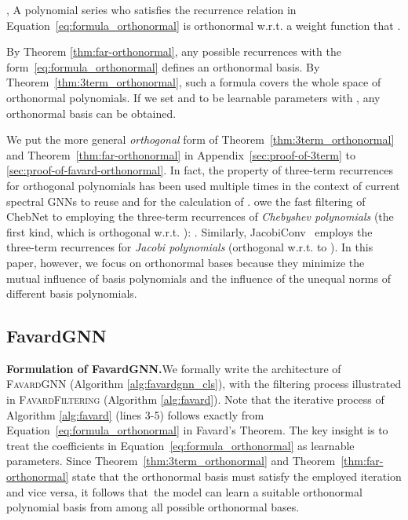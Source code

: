 \begin{theorem}
\cite{favard1935polynomes}, \citep[p.~14]{simon54orthogonal}
    \label{thm:far-orthonormal}
    A polynomial series  who satisfies the recurrence relation in Equation~\eqref{eq:formula_orthonormal}
    is orthonormal w.r.t. a weight function  that  . 
\end{theorem}

 





By Theorem \ref{thm:far-orthonormal}, 
any possible recurrences with the form~\eqref{eq:formula_orthonormal} 
defines an orthonormal basis. 
By Theorem~\ref{thm:3term_orthonormal}, 
such a formula covers the whole space of orthonormal polynomials.
If we set  and  to be learnable parameters with , any orthonormal basis can be obtained.

We put the more general \textit{orthogonal} form of Theorem~\ref{thm:3term_orthonormal} and Theorem~\ref{thm:far-orthonormal} 
in Appendix~\ref{sec:proof-of-3term} to \ref{sec:proof-of-favard-orthonormal}.  
In fact, the property of three-term recurrences for orthogonal polynomials has been used multiple times 
in the context of current spectral GNNs
to reuse  and  
for the calculation of .  
\citet{Defferrard2016cheb} 
owe the fast filtering of ChebNet to employing the three-term recurrences of \textit{Chebyshev polynomials} (the first kind, 
which is orthogonal w.r.t.  ): 
. 
Similarly, 
JacobiConv~\cite{Wang2022jacobi} employs the 
three-term recurrences for \textit{Jacobi polynomials} (orthogonal w.r.t. to ). In this paper, however, we focus on orthonormal bases because they minimize  the mutual influence of basis polynomials and the influence of the unequal norms of different basis polynomials. 


\subsection{FavardGNN}




\textbf{Formulation of FavardGNN.\quad}We formally write the architecture of
\textsc{FavardGNN} (Algorithm \ref{alg:favardgnn_cls}), with the filtering process illustrated in \textsc{FavardFiltering} (Algorithm \ref{alg:favard}). Note that the iterative process of Algorithm \ref{alg:favard} (lines 3-5) follows exactly from Equation~\eqref{eq:formula_orthonormal} in Favard's Theorem. The key insight is to treat the coefficients  in Equation~\eqref{eq:formula_orthonormal} as learnable parameters. Since Theorem~\ref{thm:3term_orthonormal} and Theorem~\ref{thm:far-orthonormal}  state that the orthonormal basis must satisfy the employed iteration and vice versa, it follows that the model can learn a suitable orthonormal polynomial basis from among all possible orthonormal bases.

